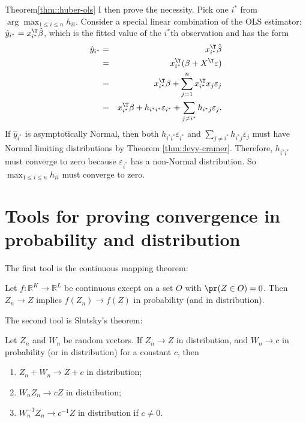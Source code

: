 \begin{myproof}{Theorem}{\ref{thm::huber-ols}}
I then prove the necessity. 
Pick one $i^*$ from $ \arg\max_{1\leq i\leq n}  h_{ii} $. 
Consider a special linear combination of the OLS estimator: $\hat{y}_{i^*} = x_{i^*}^{\T} \hat{\beta}$, which is the fitted value of the $i^*$th observation and has the form
\begin{eqnarray*}
\hat{y}_{i^*}   
&=&  x_{i^*}^{\T} \hat \beta  \\
&=&  x_{i^*}^{\T} (\beta + X^{\T} \varepsilon ) \\
&=& x_{i^*}^{\T}  \beta +  \sum_{j=1}^n x_{i^*}^{\T} x_j \varepsilon_j \\
&=& x_{i^*}^{\T}  \beta +  h_{i^*i^*} \varepsilon_{i^*} + \sum_{j\neq i^*} h_{i^*j} \varepsilon_j . 
\end{eqnarray*}
If $\hat{y}_{i^*} $ is asymptotically Normal, then both $ h_{i^*i^*} \varepsilon_{i^*} $ and $\sum_{j\neq i^*} h_{i^*j} \varepsilon_j$ must have Normal limiting distributions by Theorem \ref{thm::levy-cramer}. Therefore, $ h_{i^*i^*} $ must converge to zero because $\varepsilon_{i^*} $ has a non-Normal distribution. So $\max_{1\leq i \leq n} h_{ii}$ must converge to zero. 
\end{myproof}



\section{Tools for proving convergence in probability and distribution}\label{chapter::tools-limiting3}

The first tool is the continuous mapping theorem:
\begin{proposition}
Let $f:\mathbb{R}^{K}\rightarrow\mathbb{R}^{L}$ be continuous except
on a set $O$ with $\pr(Z\in O)=0$. Then $Z_{n}\rightarrow Z$ implies
$f(Z_{n})\rightarrow f(Z)$ in probability (and in distribution).
\end{proposition}


The second tool is Slutsky's theorem:
\begin{proposition}
Let $Z_{n}$ and $W_{n}$ be random vectors. If $Z_{n}\rightarrow Z$
in distribution, and $W_{n}\rightarrow c$ in probability (or in distribution)
for a constant $c$, then
\begin{enumerate}
\item $Z_{n}+W_{n}\rightarrow Z+c$ in distribution;
\item $W_{n}Z_{n}\rightarrow cZ$ in distribution;
\item $W_{n}^{-1} Z_{n}\rightarrow c^{-1}Z$ in distribution if $c\neq0$.
\end{enumerate}
\end{proposition}


